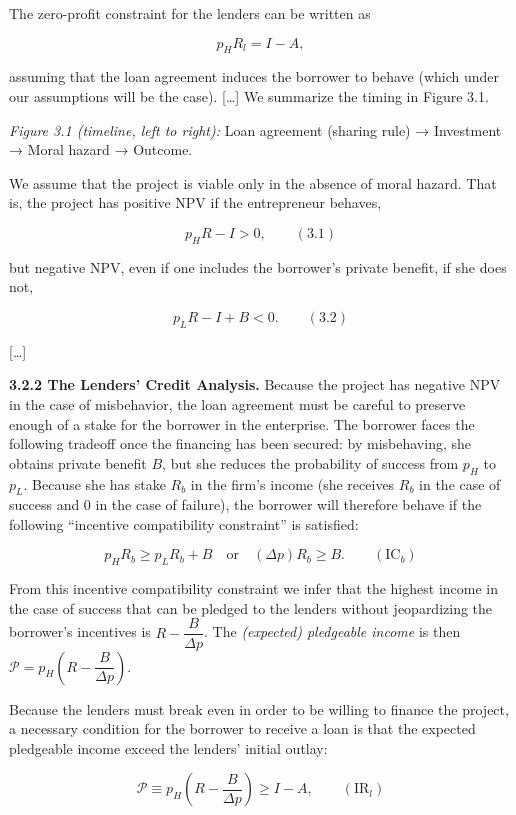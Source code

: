 \documentclass[11pt,a4paper]{article}
\begin{document}
The zero-profit constraint for the lenders can be written as

\[p_H R_l = I - A,\]

assuming that the loan agreement induces the borrower to behave (which under our assumptions will be
the case). {[}\ldots{]} We summarize the timing in Figure 3.1.

\emph{Figure 3.1 (timeline, left to right):} Loan agreement (sharing rule) → Investment → Moral
hazard → Outcome.

We assume that the project is viable only in the absence of moral hazard. That is, the project has
positive NPV if the entrepreneur behaves,

\[p_H R - I > 0, \qquad (3.1)\]

but negative NPV, even if one includes the borrower's private benefit, if she does not,

\[p_L R - I + B < 0. \qquad (3.2)\]

{[}\ldots{]}

\textbf{3.2.2 The Lenders' Credit Analysis.} Because the project has negative NPV in the case of
misbehavior, the loan agreement must be careful to preserve enough of a stake for the borrower in
the enterprise. The borrower faces the following tradeoff once the financing has been secured: by
misbehaving, she obtains private benefit \(B\), but she reduces the probability of success from
\(p_H\) to \(p_L\). Because she has stake \(R_b\) in the firm's income (she receives \(R_b\) in the
case of success and 0 in the case of failure), the borrower will therefore behave if the following
``incentive compatibility constraint'' is satisfied:

\[p_H R_b \geqslant p_L R_b + B \quad \text{or} \quad (\Delta p) R_b \geqslant B. \qquad (\text{IC}_b)\]

From this incentive compatibility constraint we infer that the highest income in the case of success
that can be pledged to the lenders without jeopardizing the borrower's incentives is
\(R - \dfrac{B}{\Delta p}\). The \emph{(expected) pledgeable income} is then
\(\mathcal{P} = p_H\left(R - \dfrac{B}{\Delta p}\right)\).

Because the lenders must break even in order to be willing to finance the project, a necessary
condition for the borrower to receive a loan is that the expected pledgeable income exceed the
lenders' initial outlay:

\[\mathcal{P} \equiv p_H\left(R - \frac{B}{\Delta p}\right) \geqslant I - A, \qquad (\text{IR}_l)\]
\end{document}
